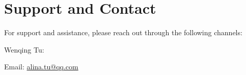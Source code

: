 \chapter{Support and Contact}\label{ch:support}

For support and assistance, please reach out through the following channels:

Wenqing Tu:

Email: \href{mailto:alina.tu@qq.com}{alina.tu@qq.com}